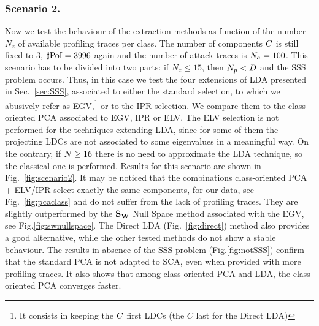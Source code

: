 \subsubsection{Scenario 2.}

Now we test the behaviour of the extraction methods as function of the number $N_z$ of available profiling traces per class. The number of components $C$ is still fixed to 3, $\sharp\mathrm{PoI}=3996$ again and the number of attack traces is $N_a=100$. This scenario has to be divided into two parts: if $N_z\leq 15$, then $N_p<D$ and the SSS problem occurs. Thus, in this case we test the four extensions of LDA presented in Sec.~\ref{sec:SSS}, associated to either the standard selection, to which we abusively refer as EGV,\footnote{It consists in keeping the $C$ first LDCs (the $C$ last for the Direct LDA)}
or to the IPR selection.  We compare them to the class-oriented PCA associated to EGV, IPR or ELV. The ELV selection is not performed for the techniques extending LDA, since for some of them the projecting LDCs are not associated to some eigenvalues in a meaningful way. On the contrary, if $N \geq 16$ there is no need to approximate the LDA technique, so the classical one is performed. Results for this scenario are shown in Fig.~\ref{fig:scenario2}. It may be noticed that the combinations class-oriented PCA + ELV/IPR select exactly the same components, for our data, see Fig.~\ref{fig:pcaclass} and do not suffer from the lack of profiling traces. They are slightly outperformed by the $\textbf{S}_{\textbf{W}}$ Null Space method associated with the EGV, see Fig.\ref{fig:swnullspace}. The Direct LDA (Fig.~\ref{fig:direct}) method also provides a good alternative, while the other tested methods do not show a stable behaviour. The results in absence of the SSS problem (Fig.\ref{fig:notSSS}) confirm that the standard PCA is not adapted to SCA, even when provided with more profiling traces. It also shows that among class-oriented PCA and LDA, the class-oriented PCA converges faster.




